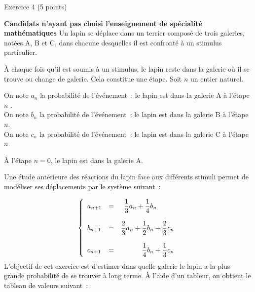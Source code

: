 
\begin{h2}Exercice 4 (5 points)\end{h2}
\textbf{Candidats n'ayant pas choisi  l'enseignement de spécialité \og mathématiques \fg{} }
\medbreak
Un lapin se déplace dans un terrier composé de trois galeries, notées A, B et C, dans chacune desquelles il est confronté à un stimulus particulier.
\par
À chaque fois qu'il est soumis à un stimulus, le lapin reste dans la galerie où il se trouve ou change de galerie. Cela constitue une étape.
\smallbreak
Soit $n$ un entier naturel.
\par
On note $a_n$ la probabilité de l'événement~: \og le lapin est dans la galerie A à l'étape $n$ \fg.\\
On note $b_n$ la probabilité de l'événement~: \og le lapin est dans la galerie B à l'étape $n $\fg.\\
On note $c_n$ la probabilité de l'événement~: \og le lapin est dans la galerie C à l'étape $n $\fg.
\par
À l'étape $n = 0$, le lapin est dans la galerie A.
\par
Une étude antérieure des réactions du lapin face aux différents stimuli permet de modéliser ses déplacements par le système suivant~:
\par
\[\left\{\begin{array}{l c r}
          a_{n+1}&=&\dfrac{1}{3}a_n + \dfrac{1}{4} b_n \phantom{+ \dfrac{2}{3}c_n}\\
          \\
          b_{n+1}&=&\dfrac{2}{3}a_n + \dfrac{1}{2} b_n + \dfrac{2}{3}c_n\\
          \\
          c_{n+1}&=&\dfrac{1}{4}b_n + \dfrac{1}{3} c_n
\end{array}\right.\]
\medbreak
L'objectif de cet exercice est d'estimer dans quelle galerie le lapin a la plus grande probabilité de se trouver à long terme.
\bigbreak
{}
\medbreak
À l'aide d'un tableur, on obtient le tableau de valeurs suivant~:
